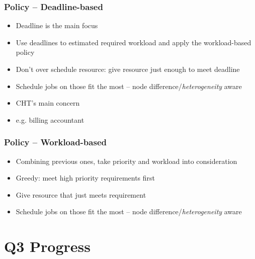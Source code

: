 \documentclass{beamer}
\begin{document}
\begin{frame}
  \frametitle{Policy -- Deadline-based}
  \begin{itemize}
    \item Deadline is the main focus
    \item Use deadlines to estimated required workload and apply
      the workload-based policy
    \item Don't over schedule resource: give resource just enough to
      meet deadline
    \item Schedule jobs on those fit the most -- node
      difference/\emph{heterogeneity} aware
    \item CHT's main concern
    \item e.g. billing accountant
  \end{itemize}
\end{frame}
\begin{frame}
  \frametitle{Policy -- Workload-based}
  \begin{itemize}
    \item Combining previous ones, take priority and workload into
      consideration
    \item Greedy: meet high priority requirements first
    \item Give resource that just meets requirement 
    \item Schedule jobs on those fit the most -- node
      difference/\emph{heterogeneity} aware
  \end{itemize}
\end{frame}

\section{Q3 Progress}
\end{document}
